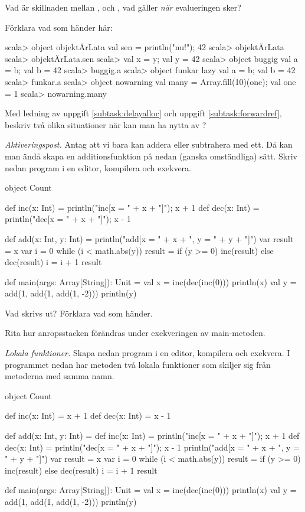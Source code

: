 \Subtask\Pen Vad är skillnaden mellan ,  och , vad gäller \emph{när} evalueringen sker?


\Subtask \label{subtask:forwardref} Förklara vad som händer här:
\begin{REPL}
scala> object objektÄrLata { val sen = { println("nu!"); 42 } }
scala> objektÄrLata
scala> objektÄrLata.sen
scala> {val x = y; val y = 42}
scala> object buggig {val a = b; val b = 42}
scala> buggig.a
scala> object funkar {lazy val a = b; val b = 42}
scala> funkar.a
scala> object nowarning {val many = Array.fill(10)(one); val one = 1}
scala> nowarning.many
\end{REPL}

\Subtask\Pen Med ledning av uppgift \ref{subtask:delayalloc} och uppgift \ref{subtask:forwardref}, beskriv två olika situationer när kan man ha nytta av ?


\Task \emph{Aktiveringspost.} Antag att vi bara kan addera eller subtrahera med ett. Då kan man ändå skapa en additionsfunktion på nedan (ganska omständliga) sätt. Skriv nedan program i en editor, kompilera och exekvera.
\begin{Code}
object Count {
  def inc(x: Int) = {println("inc[x = " + x + "]"); x + 1}
  def dec(x: Int) = {println("dec[x = " + x + "]"); x - 1}

  def add(x: Int, y: Int) = {
    println("add[x = " + x + ", y = " + y + "]")
    var result = x
    var i = 0
    while (i < math.abs(y)){
      result = if (y >= 0) inc(result) else dec(result)
      i = i + 1
    }
    result
  }

  def main(args: Array[String]): Unit = {
    val x =  inc(dec(inc(0)))
    println(x)
    val y = add(1, add(1, add(1, -2)))
    println(y)
  }
}
\end{Code}

\Subtask Vad skrivs ut? Förklara vad som händer.

\Subtask\Pen Rita hur anropsstacken förändras under exekveringen av main-metoden.


\Task \emph{Lokala funktioner.} Skapa nedan program i en editor, kompilera och exekvera. I programmet nedan har metoden  två lokala funktioner som skiljer sig från metoderna med samma namn.
\begin{Code}
object Count {
  def inc(x: Int) = x + 1
  def dec(x: Int) = x - 1

  def add(x: Int, y: Int) = {
    def inc(x: Int) = {println("inc[x = " + x + "]"); x + 1}
    def dec(x: Int) = {println("dec[x = " + x + "]"); x - 1}
    println("add[x = " + x + ", y = " + y + "]")
    var result = x
    var i = 0
    while (i < math.abs(y)){
      result = if (y >= 0) inc(result) else dec(result)
      i = i + 1
    }
    result
  }

  def main(args: Array[String]): Unit = {
    val x =  inc(dec(inc(0)))
    println(x)
    val y = add(1, add(1, add(1, -2)))
    println(y)
  }
}
\end{Code}

